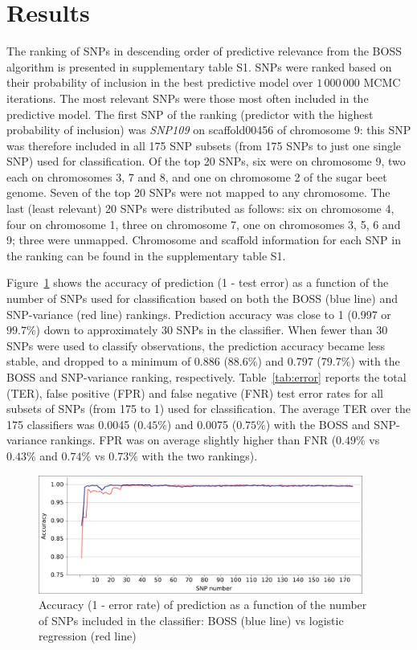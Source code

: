 \section{Results}
\label{sec:results}
The ranking of SNPs in descending order of predictive relevance from the
BOSS algorithm is presented in supplementary table S1. SNPs were ranked
based on their probability of inclusion in the best predictive model over
$1\,000\,000$ MCMC iterations. The most relevant SNPs were those most often
included in the predictive model. The first SNP of the ranking (predictor with the highest probability of
inclusion) was \emph{SNP109} on scaffold00456 of chromosome 9: this SNP was therefore
included in all 175 SNP subsets (from 175 SNPs to just one single
SNP) used for classification. Of the top 20 SNPs, six were on chromosome
9, two each on chromosomes 3, 7 and 8, and one on chromosome 2 of the sugar
beet genome. Seven of the top 20 SNPs were not mapped to any chromosome. 
The last (least relevant) 20 SNPs were distributed as follows: six on chromosome 4, four on
chromosome 1, three on chromosome 7, one on chromosomes 3, 5, 6 and 9; three
were unmapped. Chromosome and scaffold information for each SNP in the
ranking can be found in the supplementary table S1.
  
Figure~\ref{fig:accuracy} shows the accuracy of prediction (1 - test error) as a function of the number of
SNPs used for classification based on both the BOSS (blue line) and
SNP-variance (red line) rankings. Prediction accuracy was close to 1
(0.997 or $99.7\%$) down to approximately 30 SNPs in the classifier. When fewer than 30 SNPs
were used to classify observations, the prediction accuracy became less
stable, and dropped to a minimum of 0.886 ($88.6\%$) and $0.797$
($79.7\%$) with the BOSS and SNP-variance ranking, respectively.
Table~\ref{tab:error} reports the total (TER), false positive (FPR) and false
negative (FNR) test error rates for all subsets of SNPs (from 175 to 1)
used for classification. 
The average TER over the 175 classifiers was 0.0045 ($0.45\%$) and
0.0075 ($0.75\%$) with the BOSS and SNP-variance rankings. FPR was on average
slightly higher than FNR ($0.49\%$ vs $0.43\%$ and $0.74\%$ vs $0.73\%$
with the two rankings).

\begin{figure}
\includegraphics[width=0.95\textwidth]{accuracy.pdf}
\caption{Accuracy (1 - error rate) of prediction as a function of the
  number of SNPs included in the classifier: BOSS (blue line) vs
  logistic regression (red line)}
\label{fig:accuracy}       %
\end{figure}


